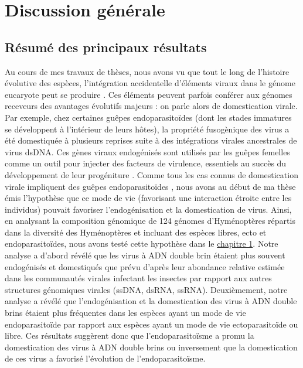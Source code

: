 \thispagestyle{empty}
\chapter{Discussion générale}
{\hypersetup{linkcolor=GREYDARK}\minitoc}
\label{chap:discuss-general}


\section{Résumé des principaux résultats}

Au cours de mes travaux de thèses, nous avons vu que tout le long de l'histoire évolutive des espèces, l'intégration accidentelle d'éléments viraux dans le génome eucaryote peut se produire \citep{katzourakis_endogenous_2010}. Ces éléments peuvent parfois conférer aux génomes receveurs des avantages évolutifs majeurs : on parle alors de domestication virale. Par exemple, chez certaines guêpes endoparasitoïdes (dont les stades immatures se développent à l'intérieur de leurs hôtes), la propriété fusogènique des virus a été domestiquée à plusieurs reprises suite à des intégrations virales ancestrales de virus dsDNA. Ces gènes viraux endogénisés sont utilisés par les guêpes femelles comme un outil pour injecter des facteurs de virulence, essentiels au succès du développement de leur progéniture \citep{drezen_endogenous_2017}. Comme tous les cas connus de domestication virale impliquent des guêpes endoparasitoïdes \citep{bezier_polydnaviruses_2009,volkoff_analysis_2010,pichon_recurrent_2015,burke_common_2019,di_giovanni_behavior-manipulating_2020}, nous avons au début de ma thèse émis l'hypothèse que ce mode de vie (favorisant une interaction étroite entre les individus) pouvait favoriser l'endogénisation et la domestication de virus. Ainsi, en analysant la composition génomique de 124 génomes d'Hyménoptères répartis dans la diversité des Hyménoptères et incluant des espèces libres, ecto et endoparasitoïdes, nous avons testé cette hypothèse dans le \hyperref[sec:chap1]{chapitre 1}. Notre analyse a d'abord révélé que les virus à ADN double brin étaient plus souvent endogénisés et domestiqués que prévu d'après leur abondance relative estimée dans les communautés virales infectant les insectes par rapport aux autres structures génomiques virales (ssDNA, dsRNA, ssRNA). Deuxièmement, notre analyse a révélé que l'endogénisation et la domestication des virus à ADN double brins étaient plus fréquentes dans les espèces ayant un mode de vie endoparasitoïde par rapport aux espèces ayant un mode de vie ectoparasitoïde ou libre. Ces résultats suggèrent donc que l'endoparasitoïsme a promu la domestication des virus à ADN double brins ou inversement que la domestication de ces virus a favorisé l'évolution de l'endoparasitoïsme.\\
 
